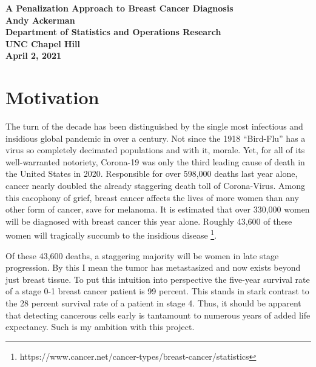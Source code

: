 \documentclass[10pt]{article}
\def\Date{April 2, 2021} %
\begin{document}
\begin{titlepage}

\vspace*{10mm}

\begin{center}
	{\bf \Large 
	 A Penalization Approach to Breast Cancer Diagnosis \\
	Andy Ackerman\\ 
	Department of Statistics and Operations Research \\
	UNC Chapel Hill\\
	\Date
	
	}
\end{center}

\end{titlepage}

%


\pagestyle{fancy}
\fancyfoot[C]{- \thepage\ -}
\fancyhead[R]{\it\small \Date}
\setcounter{page}{1}

\section{Motivation}
The turn of the decade has been distinguished by the single most infectious and insidious global pandemic in over a century.  Not since the 1918 “Bird-Flu” has a virus so completely decimated populations and with it, morale.  Yet, for all of its well-warranted notoriety, Corona-19 was only the third leading cause of death in the United States in 2020.  Responsible for over 598,000 deaths last year alone, cancer nearly doubled the already staggering death toll of Corona-Virus.  Among this cacophony of grief, breast cancer affects the lives of more women than any other form of cancer, save for melanoma.  It is estimated that over 330,000 women will be diagnosed with breast cancer this year alone.  Roughly 43,600 of these women will tragically succumb to the insidious disease \footnote{https://www.cancer.net/cancer-types/breast-cancer/statistics}.  

	Of these 43,600 deaths, a staggering majority will be women in late stage progression.  By this I mean the tumor has metastasized and now exists beyond just breast tissue.  To put this intuition into perspective the five-year survival rate of a stage 0-1 breast cancer patient is 99 percent.  This stands in stark contrast to the 28 percent survival rate of a patient in stage 4.  Thus, it should be apparent that detecting cancerous cells early is tantamount to numerous years of added life expectancy.  Such is my ambition with this project.  
	
\end{document}
